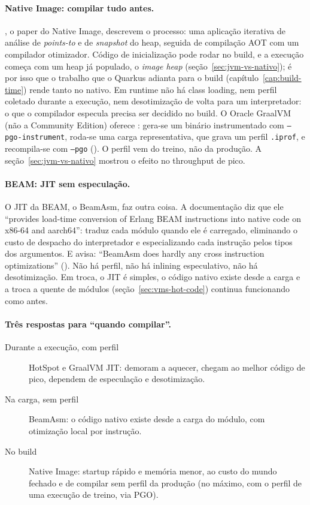 \paragraph{Native Image: compilar tudo antes.}
\textcite{paper:native-image-initialize-once}, o paper do Native Image,
descrevem o processo: uma aplicação iterativa de análise de
\emph{points-to} e de \emph{snapshot} do heap, seguida de compilação AOT
com um compilador otimizador. Código de inicialização pode rodar no
build, e a execução começa com um heap já populado, o \emph{image heap}
(seção~\ref{sec:jvm-vs-nativo}); é por isso que o trabalho que o Quarkus
adianta para o build (capítulo~\ref{cap:build-time}) rende tanto no nativo. Em runtime não
há class loading, nem perfil coletado durante a execução, nem
desotimização de volta para um interpretador: o que o compilador
especula precisa ser decidido no build. O Oracle GraalVM (não a Community
Edition) oferece : gera-se um binário instrumentado com \texttt{--pgo-instrument},
roda-se uma carga representativa, que grava um perfil \texttt{.iprof}, e
recompila-se com \texttt{--pgo} (). O perfil
vem do treino, não da produção. A seção~\ref{sec:jvm-vs-nativo} mostrou o
efeito no throughput de pico.

\paragraph{BEAM: JIT sem especulação.}
O JIT da BEAM, o BeamAsm, faz outra coisa. A documentação diz que ele
\enquote{provides load-time conversion of Erlang BEAM instructions into
native code on x86-64 and aarch64}: traduz cada módulo quando ele é
carregado, eliminando o custo de despacho do interpretador e
especializando cada instrução pelos tipos dos argumentos. E avisa:
\enquote{BeamAsm does hardly any cross instruction optimizations}
(). Não há perfil, não há inlining
especulativo, não há desotimização. Em troca, o JIT é simples, o código
nativo existe desde a carga e a troca a quente de módulos
(seção~\ref{sec:vms-hot-code}) continua funcionando como antes.

\paragraph{Três respostas para \enquote{quando compilar}.}
\begin{description}
\item[Durante a execução, com perfil] HotSpot e GraalVM JIT: demoram a
  aquecer, chegam ao melhor código de pico, dependem de especulação e
  desotimização.
\item[Na carga, sem perfil] BeamAsm: o código nativo existe desde a
  carga do módulo, com otimização local por instrução.
\item[No build] Native Image: startup rápido e memória menor, ao custo
  do mundo fechado e de compilar sem perfil da produção (no máximo, com o
  perfil de uma execução de treino, via PGO).
\end{description}

